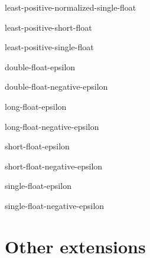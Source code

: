 \begin{constant}{least-positive-normalized-single-float}{}{}{}
  
\end{constant}

\begin{constant}{least-positive-short-float}{}{}{}
  
\end{constant}

\begin{constant}{least-positive-single-float}{}{}{}
  
\end{constant}

\begin{constant}{double-float-epsilon}{}{}{}
  
\end{constant}

\begin{constant}{double-float-negative-epsilon}{}{}{}
  
\end{constant}

\begin{constant}{long-float-epsilon}{}{}{}
  
\end{constant}

\begin{constant}{long-float-negative-epsilon}{}{}{}
  
\end{constant}

\begin{constant}{short-float-epsilon}{}{}{}
  
\end{constant}

\begin{constant}{short-float-negative-epsilon}{}{}{}
  
\end{constant}

\begin{constant}{single-float-epsilon}{}{}{}
  
\end{constant}

\begin{constant}{single-float-negative-epsilon}{}{}{}
  
\end{constant}

\section{Other extensions}
\label{sec:other-extensions}

